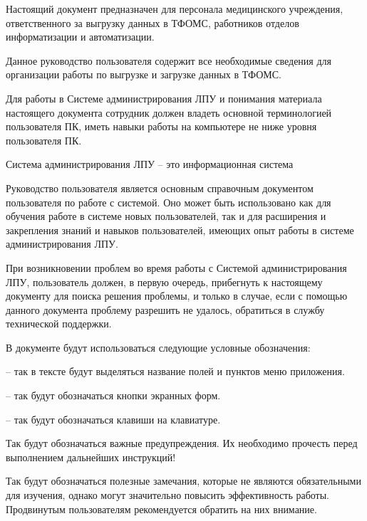 \newpage
{}

 Настоящий документ предназначен для персонала медицинского учреждения, ответственного за выгрузку данных в ТФОМС, работников отделов информатизации и автоматизации.
 
 Данное руководство пользователя содержит все необходимые сведения для организации работы по выгрузке и загрузке данных в ТФОМС.
 
 Для работы в Системе администрирования ЛПУ и понимания материала настоящего документа сотрудник должен владеть основной терминологией пользователя ПК, иметь навыки работы на компьютере не ниже уровня пользователя ПК.
 
 Система администрирования ЛПУ – это информационная система 
 

\newpage
{}

 Руководство пользователя является основным справочным документом пользователя по работе с системой. Оно может быть использовано как для обучения работе в системе новых пользователей, так и для расширения и закрепления знаний и навыков пользователей, имеющих опыт работы в системе администрирования ЛПУ.
 
 При возникновении проблем во время работы с Системой администрирования ЛПУ, пользователь должен, в первую очередь, прибегнуть к настоящему документу для поиска решения проблемы, и только в случае, если с помощью данного документа проблему разрешить не удалось, обратиться в службу технической поддержки.
 
 В документе будут использоваться следующие условные обозначения:  \vspace*{0.5em}
 
  -- так в тексте будут выделяться название полей и пунктов меню приложения.
 
  -- так будут обозначаться кнопки экранных форм.
 
  -- так будут обозначаться клавиши на клавиатуре.
 
 \begin{vnim}
  Так будут обозначаться важные предупреждения. Их необходимо прочесть перед выполнением дальнейших инструкций!
 \end{vnim}
 
 \begin{prim}
 Так будут обозначаться полезные замечания, которые не являются обязательными для изучения, однако могут значительно повысить эффективность работы. Продвинутым пользователям рекомендуется обратить на них внимание.
 \end{prim}
